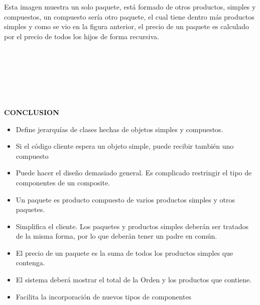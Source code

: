 \begin{flushleft}
Esta imagen muestra un solo paquete, está formado de otros productos, simples y compuestos, un compuesto sería otro paquete, el cual tiene dentro más productos simples y como se vio en la figura anterior, el precio de un paquete es calculado por el precio de todos los hijos de forma recursiva.

\textbf{}\\ 
\textbf{}\\
\textbf{}\\
\textbf{}\\
\textbf{}\\
\textbf{}\\

\textbf{CONCLUSION}

\begin{itemize}
\item Define jerarquías de clases hechas de objetos simples y compuestos. 
\item Si el código cliente espera un objeto simple, puede recibir también uno compuesto 
\item Puede hacer el diseño demasiado general. Es complicado restringir el tipo de componentes de un composite.
\item Un paquete es producto compuesto de varios productos simples y otros paquetes.
\item Simplifica el cliente.  Los paquetes y productos simples deberán ser tratados de la misma forma, por lo que deberán tener un padre en común.
\item El precio de un paquete es la suma de todos los productos simples que contenga.
\item El sistema deberá mostrar el total de la Orden y los productos que contiene.
\item Facilita la incorporación de nuevos tipos de componentes


\end{itemize} 





\end{flushleft}